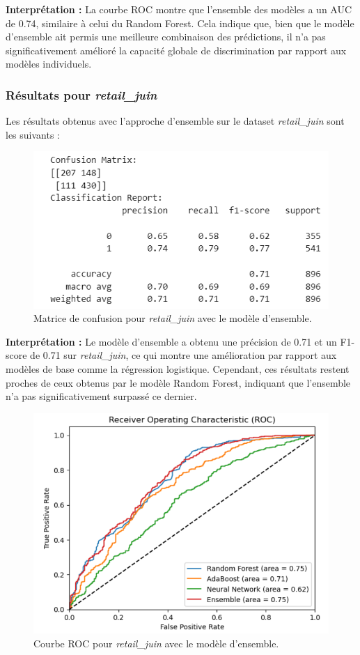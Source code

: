 \textbf{Interprétation :} La courbe ROC montre que l'ensemble des modèles a un AUC de 0.74, similaire à celui du Random Forest. Cela indique que, bien que le modèle d'ensemble ait permis une meilleure combinaison des prédictions, il n'a pas significativement amélioré la capacité globale de discrimination par rapport aux modèles individuels.

\subsubsection{Résultats pour \textit{retail\_juin}}

Les résultats obtenus avec l'approche d'ensemble sur le dataset \textit{retail\_juin} sont les suivants :

\begin{figure}[H]
    \centering
    \includegraphics[width=0.6\linewidth]{capture_modele_23.png}
    \caption{Matrice de confusion pour \textit{retail\_juin} avec le modèle d'ensemble.}
\end{figure}

\textbf{Interprétation :} Le modèle d'ensemble a obtenu une précision de 0.71 et un F1-score de 0.71 sur \textit{retail\_juin}, ce qui montre une amélioration par rapport aux modèles de base comme la régression logistique. Cependant, ces résultats restent proches de ceux obtenus par le modèle Random Forest, indiquant que l'ensemble n'a pas significativement surpassé ce dernier.

\begin{figure}[H]
    \centering
    \includegraphics[width=0.7\linewidth]{capture_modele_24.png}
    \caption{Courbe ROC pour \textit{retail\_juin} avec le modèle d'ensemble.}
    \label{fig:roc_juin_ensemble}
\end{figure}

